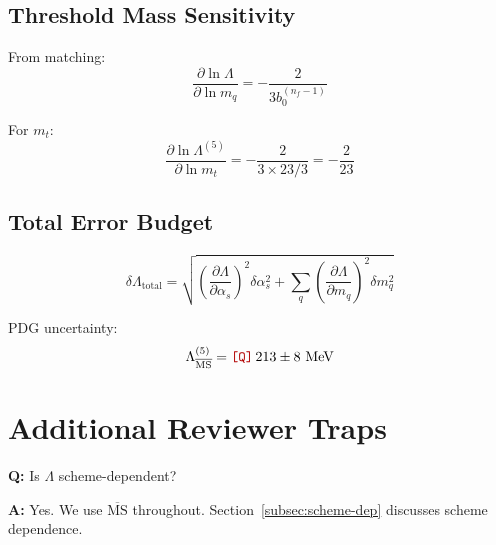 \documentclass[11pt,a4paper]{article}
\newcommand{\Qnum}[1]{\textcolor{red!70!black}{\texttt{[Q]}}\,#1}
\theoremstyle{definition}
\begin{document}
\subsection{Threshold Mass Sensitivity}
\label{subsec:thresh-sens}

From matching:
\begin{equation}
\label{eq:app-thresh-sens}
\frac{\partial\ln\Lambda}{\partial\ln m_q} = -\frac{2}{3b_0^{(n_f-1)}}
\end{equation}

For $m_t$:
\begin{equation}
\label{eq:app-thresh-sens-t}
\frac{\partial\ln\Lambda^{(5)}}{\partial\ln m_t} = -\frac{2}{3 \times 23/3} = -\frac{2}{23}
\end{equation}

\subsection{Total Error Budget}
\label{subsec:total-error}

\begin{quarantinebox}
\begin{equation}
\label{eq:app-total-error}
\delta\Lambda_{\text{total}} = \sqrt{
  \left(\frac{\partial\Lambda}{\partial\alpha_s}\right)^2\delta\alpha_s^2 +
  \sum_q \left(\frac{\partial\Lambda}{\partial m_q}\right)^2\delta m_q^2
}
\end{equation}

PDG uncertainty:
\begin{equation}
\label{eq:app-pdg-error}
\Lambda_{\overline{\text{MS}}}^{(5)} = \Qnum{213 \pm 8} \text{ MeV}
\end{equation}
\end{quarantinebox}

\section{Additional Reviewer Traps}
\label{app:more-traps}

\begin{trapbox}
\textbf{Q:} Is $\Lambda$ scheme-dependent?

\textbf{A:} Yes. We use $\overline{\text{MS}}$ throughout.
Section~\ref{subsec:scheme-dep} discusses scheme dependence.
\end{trapbox}
\end{document}
